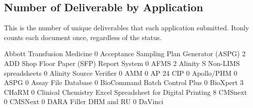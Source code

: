 \documentclass{article}
\begin{document}
\subsection{Number of Deliverable by Application}
This is the number of unique deliverables that each application submitted. Itonly counts
each document once, regardless of the status.
\begin{Schunk}
\begin{Soutput}
                              Abbott Transfusion Medicine 
                                                        0 
                Acceptance Sampling Plan Generator (ASPG) 
                                                        2 
                 ADD Shop Floor Paper (SFP) Report System 
                                                        0 
                                                     AFMS 
                                                        2 
                          Alinity S Non-LIMS spreadsheets 
                                                        0 
                                  Alinity Source Verifier 
                                                        0 
                                                      AMM 
                                                        0 
                                                AP 24 CIP 
                                                        0 
                                               Apollo/PHM 
                                                        0 
                                                     ASPG 
                                                        0 
                                      Assay File Database 
                                                        0 
                            BioCommand Batch Control Plus 
                                                        0 
                                                 BioXpert 
                                                        3 
                                                    CHaRM 
                                                        0 
Clinical Chemistry Excel Spreadsheet for Digital Printing 
                                                        8 
                                                  CMSnext 
                                                        0 
                                                  CMSNext 
                                                        0 
                                   DARA Filler DHM and RU 
                                                        0 
                                                  DaVinci 

\end{Soutput}
\end{Schunk}
\end{document}
